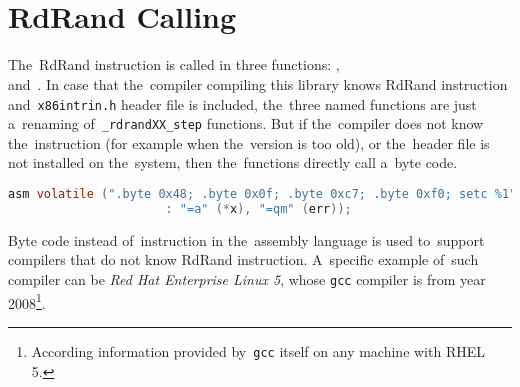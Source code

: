 \\


\\


\section{RdRand Calling}
\par{
The~RdRand instruction is called in three functions: ,  \\and~. In case that the~compiler compiling this library knows RdRand instruction and~{\tt x86intrin.h} header file is included, the~three named functions are just a~renaming of~{\tt \_rdrandXX\_step} functions. But if the~compiler does not know the~instruction (for example when the~version is too old), or the~header file is not installed on the~system, then the~functions directly call a~byte code.
}
\begin{lstlisting}[frame=none, basicstyle=\footnotesize\ttfamily, language=C, numbers=none, numberstyle=\tiny\color{black},caption= {Byte code called in {\tt rdrand64\_step}.}]
 asm volatile (".byte 0x48; .byte 0x0f; .byte 0xc7; .byte 0xf0; setc %1"
                      : "=a" (*x), "=qm" (err));
\end{lstlisting}

\par{
Byte code instead of~instruction in the~assembly language is used to~support compilers that do not know RdRand instruction. A~specific example of~such compiler can be {\em Red Hat Enterprise Linux 5}, whose {\tt gcc} compiler is from year 2008\footnote{According information provided by~{\tt gcc} itself on any machine with RHEL 5.}. 
}

